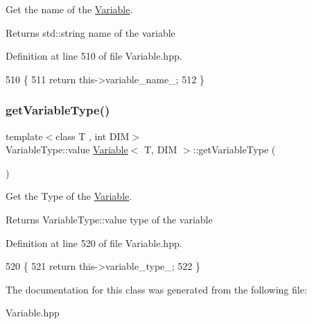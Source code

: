 Get the name of the \hyperlink{classVariable}{Variable}. 

\begin{DoxyReturn}{Returns}
std\+::string name of the variable 
\end{DoxyReturn}


Definition at line 510 of file Variable.\+hpp.


\begin{DoxyCode}
510                                                   \{
511   \textcolor{keywordflow}{return} this->variable\_name\_;
512 \}
\end{DoxyCode}
\mbox{\label{classVariable_aac48a5e228ccfdbbef672f0ac43c284a}} 
\subsubsection{\texorpdfstring{get\+Variable\+Type()}{getVariableType()}}
{\footnotesize\ttfamily template$<$class T , int D\+IM$>$ \\
Variable\+Type\+::value \hyperlink{classVariable}{Variable}$<$ T, D\+IM $>$\+::get\+Variable\+Type (\begin{DoxyParamCaption}{ }\end{DoxyParamCaption})}



Get the Type of the \hyperlink{classVariable}{Variable}. 

\begin{DoxyReturn}{Returns}
Variable\+Type\+::value type of the variable 
\end{DoxyReturn}


Definition at line 520 of file Variable.\+hpp.


\begin{DoxyCode}
520                                                     \{
521   \textcolor{keywordflow}{return} this->variable\_type\_;
522 \}
\end{DoxyCode}


The documentation for this class was generated from the following file\+:\begin{DoxyCompactItemize}
\item 
Variable.\+hpp\end{DoxyCompactItemize}
